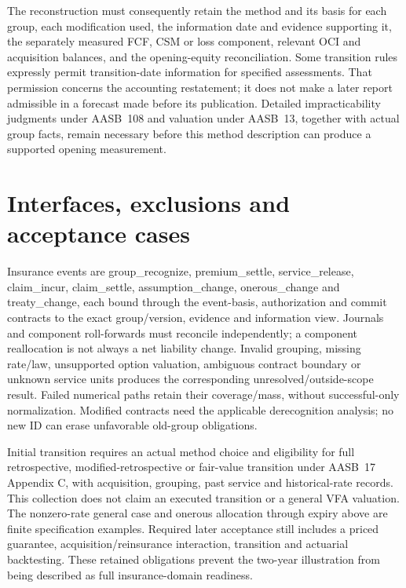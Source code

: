 The reconstruction must consequently retain the method and its basis for each
group, each modification used, the information date and evidence supporting
it, the separately measured FCF, CSM or loss component, relevant OCI and
acquisition balances, and the opening-equity reconciliation. Some transition
rules expressly permit transition-date information for specified assessments.
That permission concerns the accounting restatement; it does not make a later
report admissible in a forecast made before its publication. Detailed
impracticability judgments under AASB~108 and valuation under AASB~13, together
with actual group facts, remain necessary before this method description can
produce a supported opening measurement.


\clearpage
\hypertarget{interfaces-exclusions-and-acceptance-cases}{%
\section{Interfaces, exclusions and acceptance cases}\label{method-insurance-methods-interfaces-exclusions-and-acceptance-cases}}

Insurance events are group\_recognize, premium\_settle, service\_release, claim\_incur, claim\_settle, assumption\_change, onerous\_change and treaty\_change, each bound through the event-basis, authorization and commit contracts to the exact group/version, evidence and information view. Journals and component roll-forwards must reconcile independently; a component reallocation is not always a net liability change. Invalid grouping, missing rate/law, unsupported option valuation, ambiguous contract boundary or unknown service units produces the corresponding unresolved/outside-scope result. Failed numerical paths retain their coverage/mass, without successful-only normalization. Modified contracts need the applicable derecognition analysis; no new ID can erase unfavorable old-group obligations.

Initial transition requires an actual method choice and eligibility for full retrospective, modified-retrospective or fair-value transition under AASB~17 Appendix C, with acquisition, grouping, past service and historical-rate records. This collection does not claim an executed transition or a general VFA valuation. The nonzero-rate general case and onerous allocation through expiry above are finite specification examples. Required later acceptance still includes a priced guarantee, acquisition/reinsurance interaction, transition and actuarial backtesting. These retained obligations prevent the two-year illustration from being described as full insurance-domain readiness.
